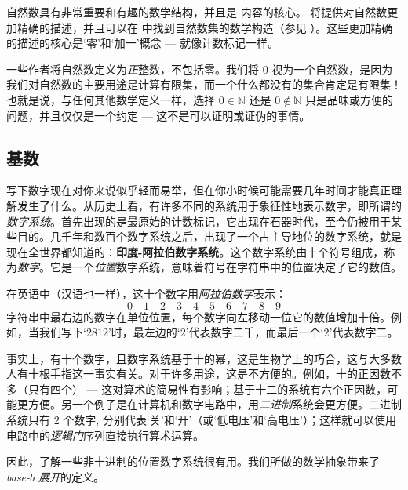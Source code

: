 自然数具有非常重要和有趣的数学结构，并且是  内容的核心。 将提供对自然数更加精确的描述，并且可以在  中找到自然数集的数学构造（参见 ）。这些更加精确的描述的核心是`零'和`加一'概念 --- 就像计数标记一样。

\begin{aside}
一些作者将自然数定义为\textit{正}整数，不包括零。我们将 $0$ 视为一个自然数，是因为我们对自然数的主要用途是计算有限集，而一个什么都没有的集合肯定是有限集！也就是说，与任何其他数学定义一样，选择 $0 \in \mathbb{N}$ 还是 $0 \not \in \mathbb{N}$ 只是品味或方便的问题，并且仅仅是一个约定 --- 这不是可以证明或证伪的事情。
\end{aside}

\subsection*{基数}

写下数字现在对你来说似乎轻而易举，但在你小时候可能需要几年时间才能真正理解发生了什么。从历史上看，有许多不同的系统用于象征性地表示数字，即所谓的\textit{数字系统}。首先出现的是最原始的计数标记，它出现在石器时代，至今仍被用于某些目的。几千年和数百个数字系统之后，出现了一个占主导地位的数字系统，就是现在全世界都知道的：\textbf{印度-阿拉伯数字系统}。这个数字系统由十个符号组成，称为\textit{数字}。它是一个\textit{位置}数字系统，意味着符号在字符串中的位置决定了它的数值。

在英语中（汉语也一样），这十个数字用\textit{阿拉伯数字}表示：
\[ 0 \quad 1 \quad 2 \quad 3 \quad 4 \quad 5 \quad 6 \quad 7 \quad 8 \quad 9 \]
字符串中最右边的数字在单位位置，每个数字向左移动一位它的数值增加十倍。例如，当我们写下`$2812$'时，最左边的`$2$'代表数字二千，而最后一个`$2$'代表数字二。

事实上，有十个数字，且数字系统基于十的幂，这是生物学上的巧合，这与大多数人有十根手指这一事实有关。对于许多用途，这是不方便的。例如，十的正因数不多（只有四个） --- 这对算术的简易性有影响；基于十二的系统有六个正因数，可能更方便。另一个例子是在计算机和数字电路中，用\textit{二进制}系统会更方便。二进制系统只有 2 个数字, 分别代表`关'和`开'（或`低电压'和`高电压'）；这样就可以使用电路中的\textit{逻辑门}序列直接执行算术运算。

因此，了解一些非十进制的位置数字系统很有用。我们所做的数学抽象带来了 \textit{base-$b$ 展开}的定义。

